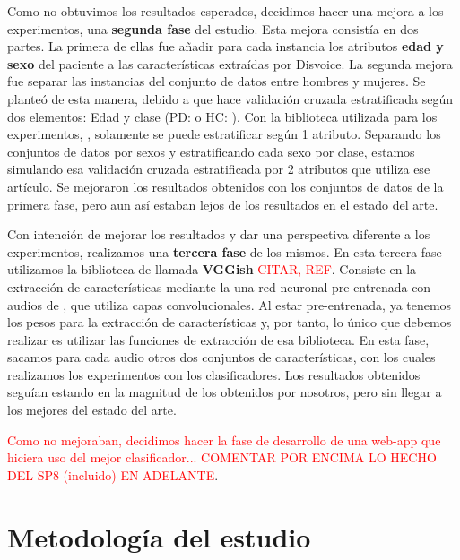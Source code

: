 Como no obtuvimos los resultados esperados, decidimos hacer una mejora a los experimentos, una \textbf{segunda fase} del estudio. Esta mejora consistía en dos partes. La primera de ellas fue añadir para cada instancia los atributos \textbf{edad y sexo} del paciente a las características extraídas por Disvoice. La segunda mejora fue separar las instancias del conjunto de datos entre hombres y mujeres. Se planteó de esta manera, debido a que \cite{Orz2016} hace validación cruzada estratificada según dos elementos: Edad y clase (PD:  o HC: ). Con la biblioteca utilizada para los experimentos, , solamente se puede estratificar según 1 atributo. Separando los conjuntos de datos por sexos y estratificando cada sexo por clase, estamos simulando esa validación cruzada estratificada por 2 atributos que utiliza ese artículo. Se mejoraron los resultados obtenidos con los conjuntos de datos de la primera fase, pero aun así estaban lejos de los resultados en el estado del arte.

Con intención de mejorar los resultados y dar una perspectiva diferente a los experimentos, realizamos una \textbf{tercera fase} de los mismos. En esta tercera fase utilizamos la biblioteca de  llamada \textbf{VGGish} \textcolor{red}{CITAR, REF}. Consiste en la extracción de características mediante la una red neuronal pre-entrenada con audios de ,  que utiliza capas convolucionales. Al estar pre-entrenada, ya tenemos los pesos para la extracción de características y, por tanto, lo único que debemos realizar es utilizar las funciones de extracción de esa biblioteca. En esta fase, sacamos para cada audio otros dos conjuntos de características, con los cuales realizamos los experimentos con los clasificadores. Los resultados obtenidos seguían estando en la magnitud de los obtenidos por nosotros, pero sin llegar a los mejores del estado del arte.

\textcolor{red}{Como no mejoraban, decidimos hacer la fase de desarrollo de una web-app que hiciera uso del mejor clasificador... COMENTAR POR ENCIMA LO HECHO DEL SP8 (incluido) EN ADELANTE}.



\section{Metodología del estudio}
